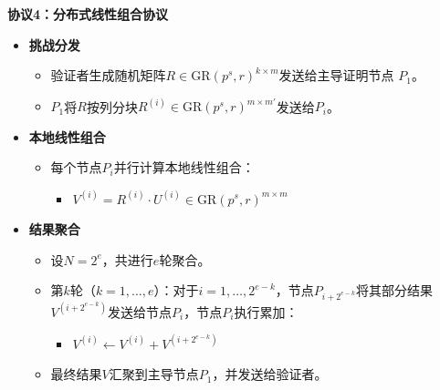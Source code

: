 \documentclass{article}
\begin{document}
\begin{tcolorbox}[
  width=\textwidth,
  colframe=black,
  colback=white,
  sharp corners,
  boxsep=2pt,
  left=2pt,right=2pt,top=3pt,bottom=3pt
]


\textbf{协议4：分布式线性组合协议}
\begin{itemize}

    \item \textbf{挑战分发}
    \begin{itemize}
      \item 验证者生成随机矩阵$R \in \mathrm{GR}(p^s, r)^{k\times m}$发送给主导证明节点
      \(P_1\)。
      \item \(P_1\)将\(R\)按列分块$R^{(i)} \in \mathrm{GR}(p^s, r)^{m\times m'}$发送给\(P_i\)。
    \end{itemize}

    \item \textbf{本地线性组合}
    \begin{itemize}
      \item 每个节点$P_i$并行计算本地线性组合：
      \begin{itemize}
        \item $V^{(i)} =R^{(i)} \cdot U^{(i)} \in \mathrm{GR}(p^s, r)^{m\times m}$
      \end{itemize}
    \end{itemize}

     \item \textbf{结果聚合}
    \begin{itemize}
      \item 设$N = 2^e$，共进行$e$轮聚合。
      \item 第$k$轮（$k = 1, \ldots, e$）：对于$i = 1, \ldots, 2^{e-k}$，节点$P_{i+2^{e-k}}$将其部分结果$V^{(i+2^{e-k})}$发送给节点$P_i$，节点$P_i$执行累加：
      \begin{itemize}
        \item $V^{(i)} \gets V^{(i)} + V^{(i+2^{e-k})}$
      \end{itemize}
      \item 最终结果$V$汇聚到主导节点$P_1$，并发送给验证者。
    \end{itemize}
  
\end{itemize}

\end{tcolorbox}
\end{document}
